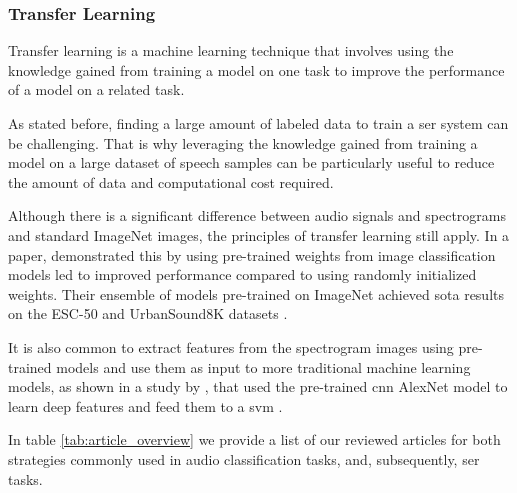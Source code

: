 \subsubsection{Transfer Learning}

Transfer learning is a machine learning technique that involves using the knowledge gained from training a model on one task to improve the performance of a model on a related task.

As stated before, finding a large amount of labeled data to train a \ac{ser} system can be challenging. That is why leveraging the knowledge gained from training a model on a large dataset of speech samples can be particularly useful to reduce the amount of data and computational cost required.

Although there is a significant difference between audio signals and spectrograms and standard ImageNet images, the principles of transfer learning still apply. In a \citeyear{rethinkPalanisamy} paper, \citeauthor{rethinkPalanisamy} demonstrated this by using pre-trained weights from image classification models led to improved performance compared to using randomly initialized weights. Their ensemble of models pre-trained on ImageNet achieved \ac{sota} results on the ESC-50 and UrbanSound8K datasets \cite{rethinkPalanisamy}.

It is also common to extract features from the spectrogram images using pre-trained models and use them as input to more traditional machine learning models, as shown in a study by \citeauthor{8085174}, that used the pre-trained \ac{cnn} AlexNet model to learn deep features and feed them to a \ac{svm} \cite{8085174}.

In table \ref{tab:article_overview} we provide a list of our reviewed articles for both strategies commonly used in audio classification tasks, and, subsequently, \ac{ser} tasks.

